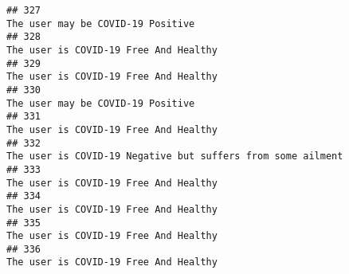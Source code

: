 \documentclass[
]{article}
\begin{document}
\begin{verbatim}
## 327                                                                                                                                                                                                                                  The user may be COVID-19 Positive
## 328                                                                                                                                                                                                                              The user is COVID-19 Free And Healthy
## 329                                                                                                                                                                                                                              The user is COVID-19 Free And Healthy
## 330                                                                                                                                                                                                                                  The user may be COVID-19 Positive
## 331                                                                                                                                                                                                                              The user is COVID-19 Free And Healthy
## 332                                                                                                                                                                                                        The user is COVID-19 Negative but suffers from some ailment
## 333                                                                                                                                                                                                                              The user is COVID-19 Free And Healthy
## 334                                                                                                                                                                                                                              The user is COVID-19 Free And Healthy
## 335                                                                                                                                                                                                                              The user is COVID-19 Free And Healthy
## 336                                                                                                                                                                                                                              The user is COVID-19 Free And Healthy

\end{verbatim}
\end{document}
